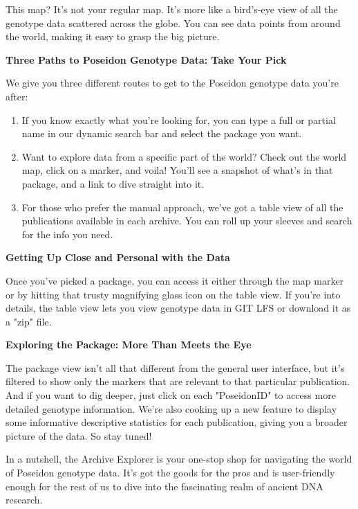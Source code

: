 \documentclass[a4paper]{article}
\begin{document}
This map? It's not your regular map. It's more like a bird's-eye view of all the genotype data scattered across the globe. You can see data points from around the world, making it easy to grasp the big picture.

\textbf{Three Paths to Poseidon Genotype Data: Take Your Pick}

We give you three different routes to get to the Poseidon genotype data you're after:
\begin{enumerate}
    \item If you know exactly what you're looking for, you can type a full or partial name in our dynamic search bar and select the package you want.

    \item Want to explore data from a specific part of the world? Check out the world map, click on a marker, and voila! You'll see a snapshot of what's in that package, and a link to dive straight into it.

   \item For those who prefer the manual approach, we've got a table view of all the publications available in each archive. You can roll up your sleeves and search for the info you need.
\end{enumerate}
\parbox[t][7cm][c]{1.0\textwidth}{

\textbf{Getting Up Close and Personal with the Data}

Once you've picked a package, you can access it either through the map marker or by hitting that trusty magnifying glass icon on the table view. If you're into details, the table view lets you view genotype data in GIT LFS or download it as a "zip" file.

\textbf{Exploring the Package: More Than Meets the Eye}

The package view isn't all that different from the general user interface, but it's filtered to show only the markers that are relevant to that particular publication. And if you want to dig deeper, just click on each "PoseidonID" to access more detailed genotype information. We're also cooking up a new feature to display some informative descriptive statistics for each publication, giving you a broader picture of the data. So stay tuned!

In a nutshell, the Archive Explorer is your one-stop shop for navigating the world of Poseidon genotype data. It's got the goods for the pros and is user-friendly enough for the rest of us to dive into the fascinating realm of ancient DNA research.}
\end{document}
